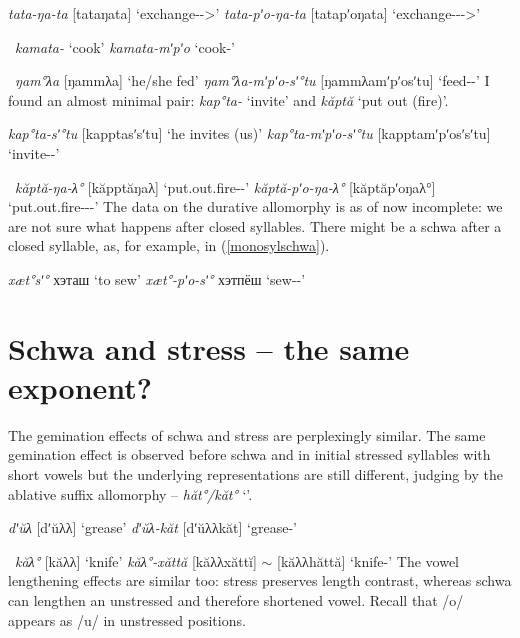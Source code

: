 \documentclass[a4paper, 12pt]{article}
\begin{document}
	\pex\label{even}\a \emph{tata-ŋa-ta} [tataŋata] \hfill `exchange-{\Gfs}-{\Tsg}>{\Pl}'		
		\a \emph{tata-pʹo-ŋa-ta} [tatapʹoŋata] \hfill `exchange-{\Dur}-{\Gfs}-{\Tsg}>{\Pl}'
	\xe	
	
	\pex~\label{odd}\a \emph{kamata-} \hfill `cook'		
		\a \emph{kamata-mʹpʹo} \hfill `cook-{\Dur}' \\		
	\xe	

	\pex~\label{schwaodd}\a \emph{ŋam°λa} [ŋammλa] \hfill `he/she fed'		
		\a \emph{ŋam°λa-mʹpʹo-sʹ°tu} [ŋammλamʹpʹosʹtu] \hfill `feed-{\Dur}-{\Hab}'
	\xe
	I found an almost minimal pair: \emph{kap°ta-} `invite' and \emph{kăptă} `put out (fire)'.
	
	\pex\label{}\a \emph{kap°ta-sʹ°tu} [kapptasʹsʹtu] \hfill `he invites (us)'
		\a \emph{kap°ta-mʹpʹo-sʹ°tu} [kapptamʹpʹosʹsʹtu] \hfill `invite-{\Dur}-{\Hab}'
	\xe
	
	\pex~\label{}\a \emph{kăptă-ŋa-λ°} [kăpptăŋaλ] \hfill `put.out.fire-{\Gfs}-{\Tsg}'
		\a\label{}\emph{kăptă-pʹo-ŋa-λ°} [kăptăpʹoŋaλ°] \hfill `put.out.fire-{\Dur}-{\Gfs}-{\Tsg}'
	\xe
	The data on the durative allomorphy is as of now incomplete: we are not sure what happens after closed syllables. There might be a schwa after a closed syllable, as, for example, in (\ref{monosylschwa}).
	
	\pex\label{}\a \emph{xæt°sʹ°} хэташ \hfill `to sew'
		\a \emph{xæt°-pʹo-sʹ°} хэтпёш \hfill `sew-{\Dur}-{\Ptcp}'\\ \hfill \parencite{barmich-vello}
	\xe
	
%		
		\section{Schwa and stress -- the same exponent?}
		
	The gemination effects of schwa and stress are perplexingly similar. The same gemination effect is observed before schwa and in initial stressed syllables with short vowels but the underlying representations are still different, judging by the ablative suffix allomorphy -- \emph{hăt°/kăt°} `{\Abl}'.
	
	\pex\label{}\a \emph{dʹŭλ} [dʹŭλλ] \hfill `grease'
		\a \emph{dʹŭλ-kăt} [dʹŭλλkăt] \hfill `grease-{\Abl}'
	\xe
	
	\pex~\label{}\a \emph{kăλ°} [kăλλ] \hfill `knife'
		\a \emph{kăλ°-xăttă} [kăλλxăttĭ] $\sim$ [kăλλhăttă] \hfill `knife-{\Abl}'
	\xe
	The vowel lengthening effects are similar too: stress preserves length contrast, whereas schwa can lengthen an unstressed and therefore shortened vowel. Recall that /o/ appears as /u/ in unstressed positions.
	
\end{document}
